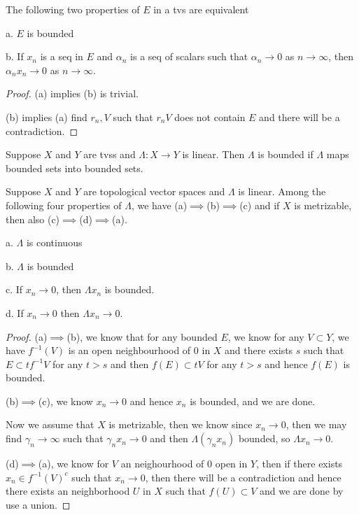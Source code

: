 \begin{theorem}
    The following two properties of $E$ in a tvs are equivalent\par
    a. $E$ is bounded\par
    b. If $x_n$ is a seq in $E$ and $\alpha_n$ is a seq of scalars such that $\alpha_n \to 0$ as $n\to\infty$, then $\alpha_nx_n \to 0$ as $n\to\infty$.
\end{theorem}
\begin{proof}
    (a) implies (b) is trivial.\par
    (b) implies (a) find $r_n, V$ such that $r_nV$ does not contain $E$ and there will be a contradiction.
\end{proof}

\begin{definition}
    Suppose $X$ and $Y$ are tvss and $\Lambda:X\to Y$ is linear. Then $\Lambda$ is bounded if $\Lambda$ maps bounded sets into bounded sets.
\end{definition}

\begin{theorem}
    Suppose $X$ and $Y$ are topological vector spaces and $\Lambda$ is linear. Among the following four properties of $\Lambda$, we have (a)$\implies$(b)$\implies$(c) and if $X$ is metrizable, then also (c)$\implies$(d)$\implies$(a).\par
    a. $\Lambda$ is continuous\par
    b. $\Lambda$ is bounded\par
    c. If $x_n \to 0$, then $\Lambda x_n$ is bounded.\par
    d. If $x_n \to 0$ then $\Lambda x_n \to 0$. 
\end{theorem}
\begin{proof}
    (a)$\implies$(b), we know that for any bounded $E$, we know for any $V \subset Y$, we have $f^{-1}(V)$ is an open neighbourhood of $0$ in $X$ and there exists $s$ such that $E\subset tf^{-1}V$ for any $t>s$ and then $f(E)\subset tV$ for any $t>s$ and hence $f(E)$ is bounded.\par
    (b)$\implies$(c), we know $x_n \to 0$ and hence $x_n$ is bounded, and we are done.\par
    Now we assume that $X$ is metrizable, then we know since $x_n \to 0$, then we may find $\gamma_n \to \infty$ such that $\gamma_nx_n \to 0$ and then $\Lambda(\gamma_nx_n)$ bounded, so $\Lambda x_n\to 0$.\par
    (d)$\implies$(a), we know for $V$ an neighourhood of $0$ open in $Y$, then if there exists $x_n \in f^{-1}(V)^{c}$ such that $x_n \to 0$, then there will be a contradiction and hence there exists an neighborhood $U$ in $X$ such that $f(U) \subset V$ and we are done by use a union.
\end{proof}


